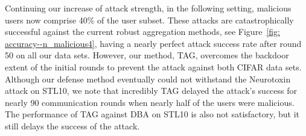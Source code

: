 \documentclass{article} %
\begin{document}
Continuing our increase of attack strength, in the following setting, malicious users now comprise 40\% of the user subset. 
These attacks are catastrophically successful against the current robust aggregation methods, see Figure~\ref{fig: accuracy--n_malicious4}, having a nearly perfect attack success rate after round 50 on all our data sets. However, our method, TAG, overcomes the backdoor extent of the initial rounds to prevent the attack against both CIFAR data sets. Although our defense method eventually could not withstand the Neurotoxin attack on STL10, we note that incredibly TAG delayed the attack's success for nearly 90 communication rounds when nearly half of the users were malicious. The performance of TAG against DBA on STL10 is also not satisfactory, but it still delays the success of the attack.
\end{document}
